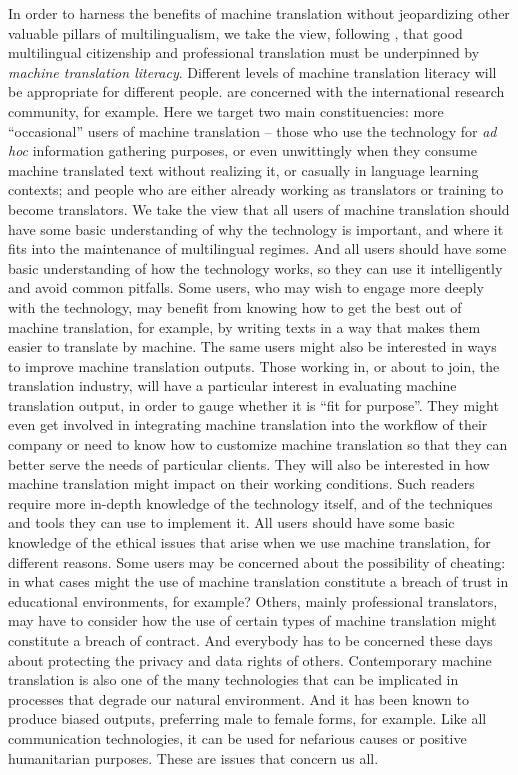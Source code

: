\documentclass[output=paper]{langscibook}
\begin{document}
In order to harness the benefits of machine translation without jeopardizing other valuable pillars of multilingualism, we take the view, following \citet{BowkerCiro2019}, that good multilingual citizenship and professional translation must be underpinned by \textit{machine translation literacy}. Different levels of machine translation literacy will be appropriate for different people. \citet{BowkerCiro2019} are concerned with the international research community, for example. Here we target two main constituencies: more “occasional” users of machine translation --  those who use the technology for \textit{ad hoc} information gathering purposes, or even unwittingly when they consume machine translated text without realizing it, or casually in language learning contexts; and people who are either already working as translators or training to become translators. We take the view that all users of machine translation should have some basic understanding of why the technology is important, and where it fits into the maintenance of multilingual regimes. And all users should have some basic understanding of how the technology works, so they can use it intelligently and avoid common pitfalls. Some users, who may wish to engage more deeply with the technology, may benefit from knowing how to get the best out of machine translation, for example, by  writing texts in a way that makes them easier to translate by machine. The same users might also be interested in ways to improve machine translation outputs. Those working in, or about to join, the translation industry, will have a particular interest in evaluating machine translation output, in order to gauge whether it is “fit for purpose”. They might even get involved in integrating machine translation into the workflow of their company or need to know how to customize machine translation so that they can better serve the needs of particular clients. They will also be interested in how machine translation might impact on their working conditions. Such readers require more in-depth knowledge of the technology itself, and of the techniques and tools they can use to implement it. All users should have some basic knowledge of the ethical issues that arise when we use machine translation, for different reasons. Some users may be concerned about the possibility of cheating: in what cases might the use of machine translation constitute a breach of trust in educational environments, for example? Others, mainly professional translators, may have to consider how the use of certain types of machine translation might constitute a breach of contract. And everybody has to be concerned these days about protecting the privacy and data rights of others. Contemporary machine translation is also one of the many technologies that can be implicated in processes that degrade our natural environment. And it has been known to produce biased outputs, preferring male to female forms, for example. Like all communication technologies, it can be used for nefarious causes or positive humanitarian purposes. These are issues that concern us all.
\end{document}
